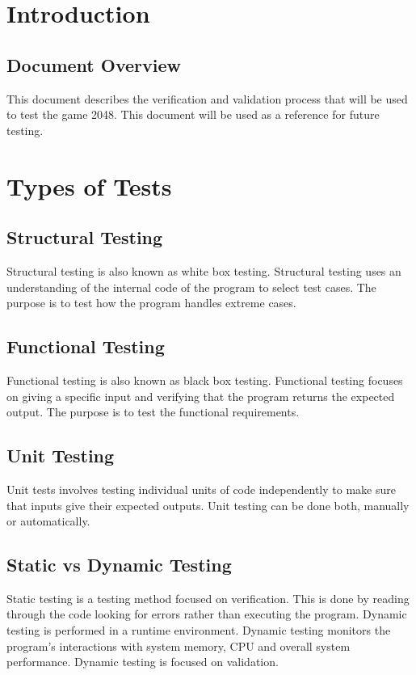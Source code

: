 \documentclass[12pt]{article}
\begin{document}
\newpage

\section{Introduction}

\subsection{Document Overview}
This document describes the verification and validation process that will be
used to test the game 2048. This document will be used as a reference for
future testing.

\section{Types of Tests}

\subsection{Structural Testing}
Structural testing is also known as white box testing. Structural testing
uses an understanding of the internal code of the program to select test cases.
The purpose is to test how the program handles extreme cases.

\subsection{Functional Testing}
Functional testing is also known as black box testing. Functional testing
focuses on giving a specific input and verifying that the program returns the
expected output. The purpose is to test the functional requirements.

\subsection{Unit Testing}
Unit tests involves testing individual units of code independently to make sure
that inputs give their expected outputs. Unit testing can be done both,
manually or automatically.

\subsection{Static vs Dynamic Testing}
Static testing is a testing method focused on verification. This is done by
reading through the code looking for errors rather than executing the program.
Dynamic testing is performed in a runtime environment. Dynamic testing monitors
the program's interactions with system memory, CPU and overall system
performance. Dynamic testing is focused on validation.
\end{document}
